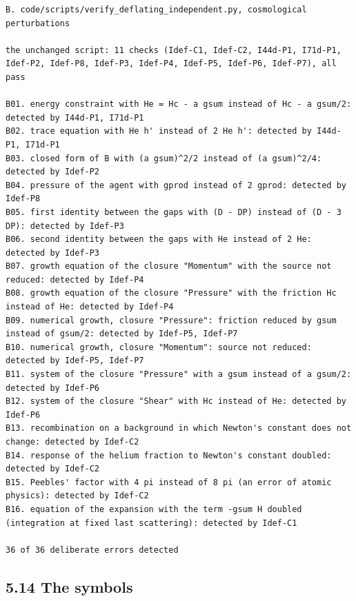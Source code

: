 \documentclass[
  10pt,
]{article}
\begin{document}
\begin{verbatim}
B. code/scripts/verify_deflating_independent.py, cosmological perturbations

the unchanged script: 11 checks (Idef-C1, Idef-C2, I44d-P1, I71d-P1, Idef-P2, Idef-P8, Idef-P3, Idef-P4, Idef-P5, Idef-P6, Idef-P7), all pass

B01. energy constraint with He = Hc - a gsum instead of Hc - a gsum/2: detected by I44d-P1, I71d-P1
B02. trace equation with He h' instead of 2 He h': detected by I44d-P1, I71d-P1
B03. closed form of B with (a gsum)^2/2 instead of (a gsum)^2/4: detected by Idef-P2
B04. pressure of the agent with gprod instead of 2 gprod: detected by Idef-P8
B05. first identity between the gaps with (D - DP) instead of (D - 3 DP): detected by Idef-P3
B06. second identity between the gaps with He instead of 2 He: detected by Idef-P3
B07. growth equation of the closure "Momentum" with the source not reduced: detected by Idef-P4
B08. growth equation of the closure "Pressure" with the friction Hc instead of He: detected by Idef-P4
B09. numerical growth, closure "Pressure": friction reduced by gsum instead of gsum/2: detected by Idef-P5, Idef-P7
B10. numerical growth, closure "Momentum": source not reduced: detected by Idef-P5, Idef-P7
B11. system of the closure "Pressure" with a gsum instead of a gsum/2: detected by Idef-P6
B12. system of the closure "Shear" with Hc instead of He: detected by Idef-P6
B13. recombination on a background in which Newton's constant does not change: detected by Idef-C2
B14. response of the helium fraction to Newton's constant doubled: detected by Idef-C2
B15. Peebles' factor with 4 pi instead of 8 pi (an error of atomic physics): detected by Idef-C2
B16. equation of the expansion with the term -gsum H doubled (integration at fixed last scattering): detected by Idef-C1

36 of 36 deliberate errors detected
\end{verbatim}

\hypertarget{the-symbols}{%
\subsection{5.14 The symbols}\label{the-symbols}}
\end{document}

